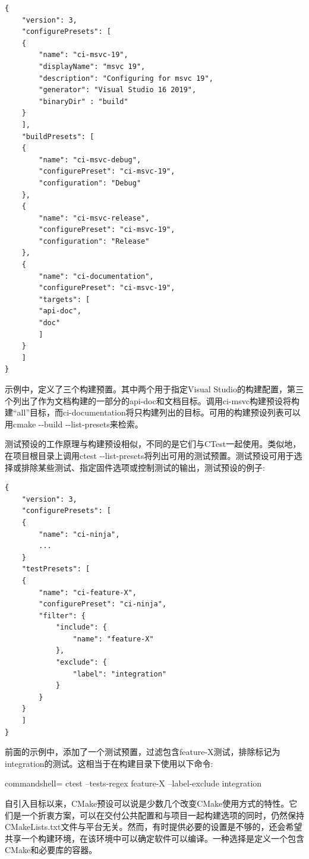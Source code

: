 \begin{lstlisting}[style=styleCMake]
{
	"version": 3,
	"configurePresets": [
	{
		"name": "ci-msvc-19",
		"displayName": "msvc 19",
		"description": "Configuring for msvc 19",
		"generator": "Visual Studio 16 2019",
		"binaryDir" : "build"
	}
	],
	"buildPresets": [
	{
		"name": "ci-msvc-debug",
		"configurePreset": "ci-msvc-19",
		"configuration": "Debug"
	},
	{
		"name": "ci-msvc-release",
		"configurePreset": "ci-msvc-19",
		"configuration": "Release"
	},
	{
		"name": "ci-documentation",
		"configurePreset": "ci-msvc-19",
		"targets": [
		"api-doc",
		"doc"
		]
	}
	]
}
\end{lstlisting}

示例中，定义了三个构建预置。其中两个用于指定Visual Studio的构建配置，第三个列出了作为文档构建的一部分的api-doc和文档目标。调用ci-msvc构建预设将构建“all”目标，而ci-documentation将只构建列出的目标。可用的构建预设列表可以用cmake -{}-build -{}-list-presets来检索。

测试预设的工作原理与构建预设相似，不同的是它们与CTest一起使用。类似地，在项目根目录上调用ctest -{}-list-presets将列出可用的测试预置。测试预设可用于选择或排除某些测试、指定固件选项或控制测试的输出，测试预设的例子:

\begin{lstlisting}[style=styleCMake]
{
	"version": 3,
	"configurePresets": [
	{
		"name": "ci-ninja",
		...
	}
	"testPresets": [
	{
		"name": "ci-feature-X",
		"configurePreset": "ci-ninja",
		"filter": {
			"include": {
				"name": "feature-X"
			},
			"exclude": {
				"label": "integration"
			}
		}
	}
	]
}
\end{lstlisting}

前面的示例中，添加了一个测试预置，过滤包含feature-X测试，排除标记为integration的测试。这相当于在构建目录下使用以下命令:

\begin{tcblisting}{commandshell={}}
ctest --tests-regex feature-X --label-exclude integration
\end{tcblisting}

自引入目标以来，CMake预设可以说是少数几个改变CMake使用方式的特性。它们是一个折衷方案，可以在交付公共配置和与项目一起构建选项的同时，仍然保持CMakeLists.txt文件与平台无关。然而，有时提供必要的设置是不够的，还会希望共享一个构建环境，在该环境中可以确定软件可以编译。一种选择是定义一个包含CMake和必要库的容器。















